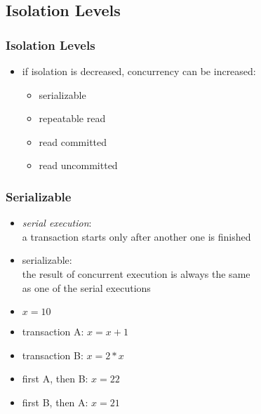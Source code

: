 \documentclass[dvipsnames]{beamer}
\theoremstyle{plain}
\begin{document}
\subsection{Isolation Levels}

\begin{frame}
  \frametitle{Isolation Levels}

  \begin{itemize}
    \item if isolation is decreased, concurrency can be increased:
    \begin{itemize}
      \item serializable
      \item repeatable read
      \item read committed
      \item read uncommitted
    \end{itemize}
  \end{itemize}
\end{frame}

\begin{frame}
  \frametitle{Serializable}

  \begin{itemize}
    \item \emph{serial execution}:\\
      a transaction starts only after another one is finished

    \pause
    \item \alert{serializable}:\\
      the result of concurrent execution is always the same\\
      as one of the serial executions
  \end{itemize}

  \pause
  \begin{example}
    \begin{itemize}
      \item $x=10$
      \item transaction A: $x=x+1$
      \item transaction B: $x=2*x$

      \pause
      \medskip
      \item first A, then B: $x=22$
      \item first B, then A: $x=21$
    \end{itemize}
  \end{example}
\end{frame}
\end{document}
